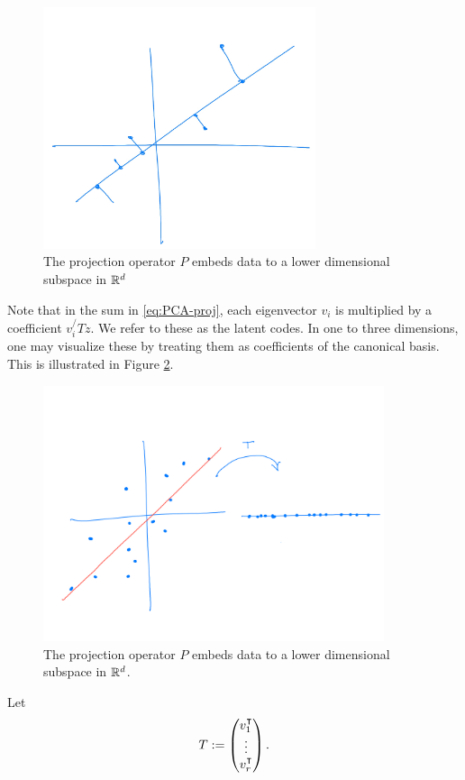 \begin{figure}[h] \label{fig:pca-proj}
\centering
\includegraphics[width=8cm]{figs/PCA/PCA-proj.jpeg}
\caption{The projection operator $P$ embeds data to a lower dimensional subspace in $\mathbb{R}^d$}
\end{figure}

Note that in the sum in \eqref{eq:PCA-proj}, each eigenvector $v_i$ is multiplied by a coefficient $v_i^/T z$. We refer to these as the latent codes. In one to three dimensions, one may visualize these by treating them as coefficients of the canonical basis. This is illustrated in Figure \ref{fig:pca-latent-codes}. 
\begin{figure}[h] \label{fig:pca-latent-codes}
\centering
\includegraphics[width=10cm]{figs/PCA/PCA-latent-code.jpeg}
\caption{The projection operator $P$ embeds data to a lower dimensional subspace in $\mathbb{R}^d$.}
\end{figure}
Let
$$
T := 
\begin{pmatrix}
v_1^\T\\
\vdots\\
v_r^\T
\end{pmatrix}.
$$



